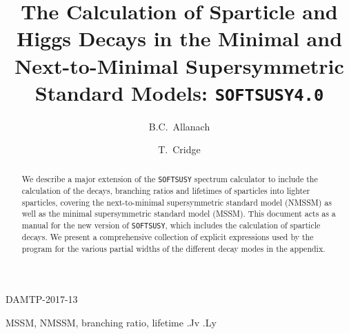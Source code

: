 \documentclass[final,3p,times,pdflatex]{elsarticle}
\begin{document}
\begin{frontmatter}

\begin{flushright}
DAMTP-2017-13\\
\end{flushright}

\title{The Calculation of Sparticle and Higgs Decays in the Minimal and Next-to-Minimal Supersymmetric Standard Models: {\tt SOFTSUSY4.0}}

\author[damtp]{B.C.~Allanach}
\author[damtp]{T.~Cridge}
\address[damtp]{DAMTP, CMS, University of Cambridge, Wilberforce road,
  Cambridge, CB3  0WA, United Kingdom}
\begin{abstract}
We describe a major extension of the {\tt SOFTSUSY} spectrum calculator to
include 
the calculation of the decays, branching ratios and lifetimes of sparticles
into lighter 
sparticles, covering  the next-to-minimal supersymmetric standard model
(NMSSM) as 
well as the minimal supersymmetric standard model (MSSM).
This document
acts as a manual for the
new version of {\tt SOFTSUSY}, which includes the calculation of sparticle
decays. We present a comprehensive collection of explicit expressions used by
the program for the various partial widths of the different decay modes in the
appendix.  
\end{abstract}

\begin{keyword}
MSSM, NMSSM, branching ratio, lifetime
.Jv
.Ly
\end{keyword}
\end{frontmatter}
\end{document}
